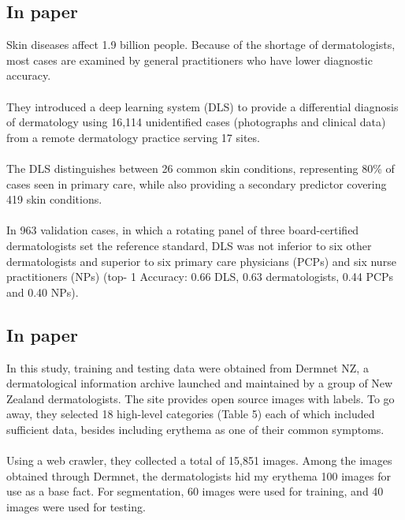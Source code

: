 \subsection{In paper\cite{r3}}
Skin diseases affect 1.9 billion people.
Because of the shortage of dermatologists, most cases are examined by general practitioners who have lower diagnostic accuracy.\\\\

They introduced a deep learning system (DLS) to provide a differential diagnosis of dermatology using 16,114 unidentified cases (photographs and clinical data) from a remote dermatology practice serving 17 sites.\\\\
The DLS distinguishes between 26 common skin conditions, representing 80\% of cases seen in primary care, while also providing a secondary predictor covering 419 skin conditions.\\\\
In 963 validation cases, in which a rotating panel of three board-certified dermatologists set the reference standard, DLS was not inferior to six other dermatologists and superior to six primary care physicians (PCPs) and six nurse practitioners (NPs) (top- 1 Accuracy: 0.66 DLS, 0.63 dermatologists, 0.44 PCPs and 0.40 NPs).
\subsection{In paper\cite{r4}}
In this study, training and testing data were obtained from Dermnet NZ, a dermatological information archive launched and maintained by a group of New Zealand dermatologists. The site provides open source images with labels.
To go away, they selected 18 high-level categories (Table 5) each of which included sufficient data, besides including erythema as one of their common symptoms.\\\\

Using a web crawler, they collected a total of 15,851 images.
Among the images obtained through Dermnet, the dermatologists hid my erythema 100 images for use as a base fact.
For segmentation, 60 images were used for training, and 40 images were used for testing.\\\\

